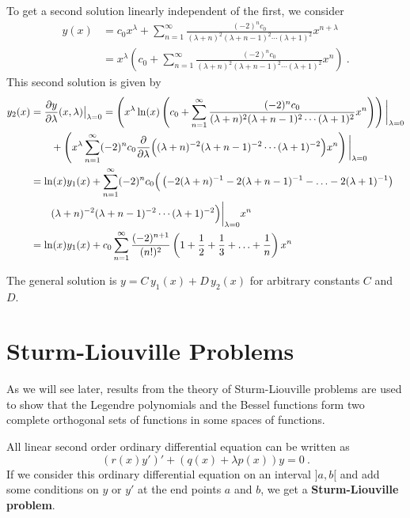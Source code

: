 \begin{egg}
To get a second solution linearly independent of the first, we
consider
\begin{align*}
y(x) &= c_0 x^\lambda + \sum_{n=1}^\infty 
\frac{(-2)^n c_0} {(\lambda +n)^2(\lambda +n-1)^2\cdots (\lambda + 1)^2}
x^{n+\lambda} \\
&= x^\lambda \left(c_0  + \sum_{n=1}^\infty 
\frac{(-2)^n c_0} {(\lambda +n)^2(\lambda +n-1)^2\cdots (\lambda + 1)^2}
x^n\right) \ .
\end{align*}
This second solution is given by
\begin{align*}
y_2(x) &= \frac{\partial{y}}{\partial \lambda}(x,\lambda)\big|_{\lambda=0}
= \left(x^\lambda\ln(x) \left(c_0  + \sum_{n=1}^\infty 
\frac{(-2)^n c_0} {(\lambda +n)^2(\lambda +n-1)^2\cdots (\lambda + 1)^2}
x^n\right)\right)\bigg|_{\lambda=0} \\
&\qquad + \left(x^\lambda \sum_{n=1}^\infty (-2)^n c_0
\frac{\partial}{\partial \lambda}{\Big((\lambda +n)^{-2}(\lambda +n-1)^{-2}\cdots
(\lambda + 1)^{-2}\Big)} x^n\right)\bigg|_{\lambda=0} \\
&= \ln(x) y_1(x) + \sum_{n=1}^\infty (-2)^n c_0 \Big(\left(
-2(\lambda +n)^{-1}-2(\lambda +n-1)^{-1} - \ldots -2 (\lambda + 1)^{-1}\right) \\
&\qquad (\lambda +n)^{-2}(\lambda +n-1)^{-2}\cdots (\lambda +
1)^{-2}\Big)\bigg|_{\lambda=0} x^n \\
&= \ln(x) y_1(x) + c_0 \sum_{n=1}^\infty \frac{(-2)^{n+1}}{(n!)^2}
\left(1 + \frac{1}{2} + \frac{1}{3} + \ldots + \frac{1}{n}\right) x^n
\end{align*}

The general solution is
$\displaystyle y = C\, y_1(x) + D\, y_2(x)$ for arbitrary constants
$C$ and $D$.
\end{egg}

\section{Sturm-Liouville Problems}

As we will see later, results from the theory of Sturm-Liouville
problems are used to show that the Legendre polynomials and the Bessel
functions form two complete orthogonal sets of functions in some
spaces of functions.

All linear second order ordinary differential equation can be written as
\[
(r(x) y')' + (q(x) + \lambda p(x)) y = 0 \ .
\]
If we consider this ordinary differential equation on an interval
$]a,b[$ and add some conditions on $y$ or $y'$ at the end points $a$
and $b$, we get a
{\bfseries Sturm-Liouville problem}.

